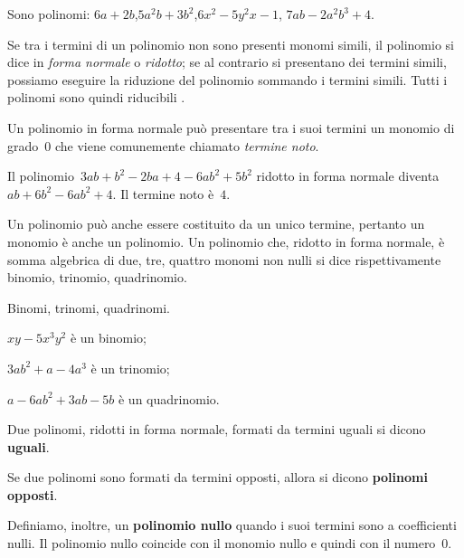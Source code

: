 \begin{esempio}{}{}
Sono polinomi:
\(6a+2b\),\quad \(5a^2b+3b^2\),\quad \(6x^2-5y^2x-1\),\quad 
\(7ab-2a^2b^3+4\).
\end{esempio}

Se tra i termini di un polinomio non sono presenti monomi simili, il 
polinomio si dice in \emph{forma normale} o
\emph{ridotto}; se al contrario si presentano dei termini simili, 
possiamo eseguire la riduzione del polinomio sommando i termini simili. 
Tutti i polinomi sono quindi riducibili 
.

Un polinomio in forma normale può presentare tra i suoi termini un 
monomio di grado~0 che viene comunemente chiamato 
\emph{termine noto}.

\begin{esempio}{}{}
Il polinomio~\(3ab+b^2-2ba+4-6ab^2+5b^2\) ridotto in forma normale 
diventa~\(ab+6b^2-6ab^2+4\). Il termine noto è~\(4\).
\end{esempio}


Un polinomio può anche essere costituito da un unico termine, pertanto 
un monomio è anche un polinomio.
Un polinomio che, ridotto in forma normale, è somma algebrica di due, 
tre, quattro monomi non nulli si dice rispettivamente binomio, trinomio, 
quadrinomio.

\begin{esempio}{}{}
Binomi, trinomi, quadrinomi.
\begin{enumeratea}
\item \(xy-5x^3y^2\) \quad è un binomio;
\item \(3ab^2 +a-4a^3\) \quad è un trinomio;
\item \(a-6ab^2+3ab-5b\) \quad è un quadrinomio.
\end{enumeratea}
\end{esempio}

\begin{definizione}{}{}
Due polinomi, ridotti in forma normale, formati da termini uguali si dicono 
\textbf{uguali}.


Se due polinomi sono formati da termini opposti, allora si dicono 
\textbf{polinomi opposti}.

Definiamo, inoltre, un \textbf{polinomio nullo} quando i suoi termini sono
a coefficienti nulli. 
Il polinomio nullo coincide con il monomio nullo e quindi con il numero~0.
\end{definizione}

